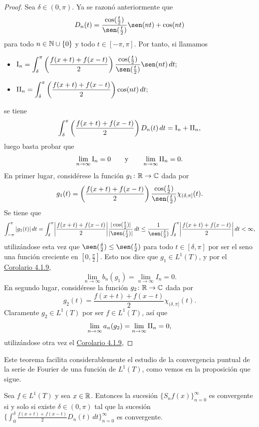\documentclass[a4paper, 11pt, oneside]{report}
\begin{document}
\begin{proof}
  Sea $\delta \in (0,\pi)$. Ya se razonó anteriormente que
  \[D_n(t) = \frac{\cos(\frac{t}{2})}{\sen(\frac{t}{2})}\sen(nt)+\cos(nt)\]
  para todo $n \in \mathbb N \cup \{0\}$ y todo $t \in [-\pi,\pi]$. Por tanto, si llamamos
  \begin{itemize}
    \item $\displaystyle \textup{I}_n = \int_\delta^\pi\left(\frac{f(x+t)+f(x-t)}{2}\right)\frac{\cos(\frac{t}{2})}{\sen(\frac{t}{2})}\sen(nt) \, dt;$
    \item $\displaystyle \textup{II}_n =  \int_\delta^\pi\left(\frac{f(x+t)+f(x-t)}{2}\right)\cos(nt) \, dt;$
  \end{itemize}
  se tiene
  \[\int_\delta^\pi \left(\frac{f(x+t)+f(x-t)}{2}\right)D_n(t) \, dt = \textup{I}_n + \textup{II}_n,\]
  luego basta probar que
  \[\lim_{n \to \infty} \textup{I}_n = 0 \qquad \textup{y} \qquad \lim_{n \to \infty} \textup{II}_n = 0.\]
  En primer lugar, considérese la función $g_1 \colon \mathbb R \to \mathbb C$ dada por
  \[g_1(t) = \left(\frac{f(x+t)+f(x-t)}{2}\right)\frac{\cos(\frac{t}{2})}{\sen(\frac{t}{2})}\chi_{(\delta,\pi]}(t).\]
  Se tiene que 
  \[\int_{-\pi}^\pi |g_1(t)| \, dt = \int_{\delta}^\pi \biggl|\frac{f(x+t)+f(x-t)}{2}\biggr|\frac{|\cos(\frac{t}{2})|}{|\sen(\frac{t}{2})|} \, dt \leq\frac{1}{\sen(\frac{\delta}{2})} \int_\delta^\pi \biggl|\frac{f(x+t)+f(x-t)}{2}\biggr| \, dt < \infty,\]
  utilizándose esta vez que $\sen(\frac{\delta}{2}) \leq \sen(\frac{t}{2})$ para todo $t \in [\delta,\pi]$ por ser el seno una función creciente en $[0,\frac{\pi}{2}]$. Esto nos dice que $g_1 \in L^1(T)$, y por el \hyperref[cor:4.1.9]{\color{c1}Corolario 4.1.9},
  \[\lim_{n \to \infty} b_n(g_1) = \lim_{n \to \infty} I_n = 0.\]
  En segundo lugar, considérese la función $g_2 \colon \mathbb R \to \mathbb C$ dada por
  \[g_2(t) = \frac{f(x+t)+f(x-t)}{2}\chi_{(\delta,\pi]}(t).\]
  Claramente $g_2 \in L^1(T)$ por ser $f \in L^1(T)$, así que
  \[\lim_{n \to \infty} a_n(g_2) = \lim_{n \to \infty} \textup{II}_n = 0,\]
  utilizándose otra vez el \hyperref[cor:4.1.9]{\color{c1}Corolario 4.1.9},
\end{proof}

Este teorema facilita considerablemente el estudio de la convergencia puntual de la serie de Fourier de una función de $L^1(T)$, como vemos en la proposición que sigue.

\begin{proposition}
  Sea $f \in L^1(T)$ y sea $x \in \mathbb R$. Entonces la sucesión $\{S_nf(x)\}_{n=0}^\infty$ es convergente si y solo si existe $\delta \in (0,\pi)$ tal que la sucesión $\{\int_0^\delta \frac{f(x+t)+f(x-t)}{2}D_n(t)\, dt\}_{n=0}^\infty$ es convergente.
\end{proposition}
\end{document}
